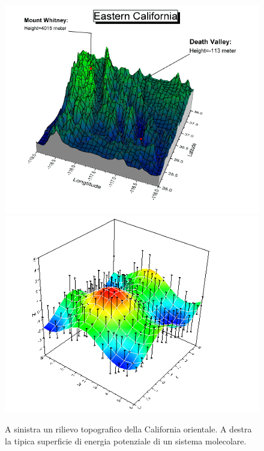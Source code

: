 \documentclass[oneside]{amsbook}
\numberwithin{section}{chapter}
\numberwithin{equation}{section}
\numberwithin{figure}{section}
\begin{document}
\begin{figure}[H]
\centering
\caption{A sinistra un rilievo topografico della California orientale. A destra la tipica superficie di energia potenziale di un sistema molecolare.}\label{pesconf}
\includegraphics[scale=1.2]{PES_California}
\hfil
\includegraphics[scale=1.2]{PES_molecola}
\end{figure}
\end{document}
